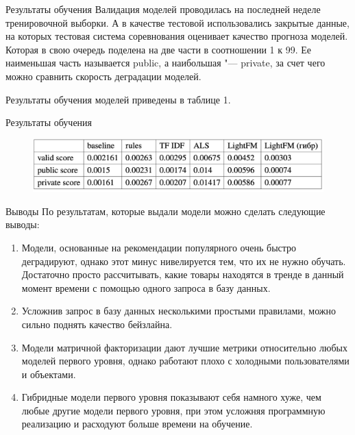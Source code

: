 \documentclass{beamer}
\begin{document}
\begin{frame}{Результаты обучения}
  Валидация моделей проводилась на последней неделе тренировочной выборки. А в качестве тестовой использовались закрытые данные,
  на которых тестовая система соревнования оценивает качество прогноза моделей. Которая в свою очередь поделена на две части в
  соотношении 1 к 99. Ее наименьшая часть называется public, а наибольшая "--- private, за счет чего можно сравнить скорость
  деградации моделей.

  Результаты обучения моделей приведены в таблице 1.
\end{frame}

\begin{frame}{Результаты обучения}
  \begin{figure}[H]
    \centering
    \includegraphics[width=1.\textwidth]{pic/5}
    \label{fig:img1}
  \end{figure}
\end{frame}

\begin{frame}{Выводы}
  По результатам, которые выдали модели можно сделать следующие выводы:
\begin{enumerate}
    \item Модели, основанные на рекомендации популярного очень быстро деградируют, однако этот минус нивелируется
    тем, что их не нужно обучать. Достаточно просто рассчитывать, какие товары находятся в тренде в данный момент времени
    с помощью одного запроса в базу данных.
    \item Усложнив запрос в базу данных несколькими простыми правилами, можно сильно поднять качество бейзлайна.
    \item Модели матричной факторизации дают лучшие метрики относительно любых моделей первого уровня, однако работают плохо
    с холодными пользователями и объектами.
    \item Гибридные модели первого уровня показывают себя намного хуже, чем любые другие модели первого уровня, при этом усложняя
    программную реализацию и расходуют больше времени на обучение.
\end{enumerate}
\end{frame}
\end{document}
